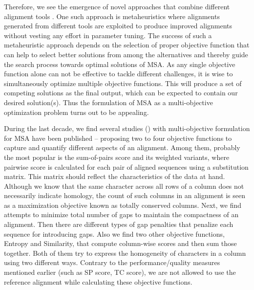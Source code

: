 Therefore, we see the emergence of novel approaches that combine different alignment tools \citep{thompson2011comprehensive}. One such approach is metaheuristics where alignments generated from different tools are exploited to produce improved alignments without vesting any effort in parameter tuning. The success of such a metaheuristic approach depends on the selection of proper objective function that can help to select better solutions from among the alternatives and thereby guide the search process towards optimal solutions of MSA.
As any single objective function alone can not be effective to tackle different challenges, it is wise to simultaneously optimize multiple objective functions. This will produce a set of competing solutions as the final output, which can be expected to contain our desired solution(s). Thus the formulation of MSA as a multi-objective optimization problem turns out to be appealing.

During the last decade, we find several studies (\citep{da2010alineaga, ortuno2013optimizing, soto2014multi, abbasi2015local, rubio2016hybrid,zambrano2017comparing}) with multi-objective formulation for MSA have been published -- proposing two to four objective functions to capture and quantify different aspects of an alignment. Among them, probably the most popular is the sum-of-pairs score and its weighted variants, where pairwise score is calculated for each pair of aligned sequences using a substitution matrix. This matrix should reflect the characteristics of the data at hand. Although we know that the same character across all rows of a column does not necessarily indicate homology, the count of such columns in an alignment is seen as a maximization objective known as totally conserved columns. Next, we find attempts to minimize total number of gaps to maintain the compactness of an alignment. Then there are different types of gap penalties that penalize each sequence for introducing gaps. Also we find two other objective functions, Entropy and Similarity, that compute column-wise scores and then sum those together. Both of them try to express the homogeneity of characters in a column using two different ways. Contrary to the performance/quality measures mentioned earlier (such as SP score, TC score), we are not allowed to use the reference alignment while calculating these objective functions. 

